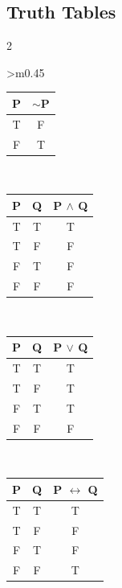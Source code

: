 \newpage

\subsection{Truth Tables}

\begin{multicols}{2}
\centering

\begin{tabular}{>{\centering\arraybackslash}m{0.45\textwidth}}

\begin{minipage}[c][12em][c]{\linewidth}
\centering
{}
\begin{tabular}{|c|c|}
\hline
\textbf{P} & \textbf{$\sim$P} \\ \hline
T & F \\ \hline
F & T \\ \hline
\end{tabular}
\end{minipage}
\\

\begin{minipage}[c][12em][c]{\linewidth}
\centering
{}
\begin{tabular}{|c|c|c|}
\hline
\textbf{P} & \textbf{Q} & \textbf{P $\land$ Q} \\ \hline
T & T & T \\ \hline
T & F & F \\ \hline
F & T & F \\ \hline
F & F & F \\ \hline
\end{tabular}
\end{minipage}
\\

\begin{minipage}[c][12em][c]{\linewidth}
\centering
{}
\begin{tabular}{|c|c|c|}
\hline
\textbf{P} & \textbf{Q} & \textbf{P $\lor$ Q} \\ \hline
T & T & T \\ \hline
T & F & T \\ \hline
F & T & T \\ \hline
F & F & F \\ \hline
\end{tabular}
\end{minipage}
\\

\begin{minipage}[c][12em][c]{\linewidth}
\centering
{}
\begin{tabular}{|c|c|c|}
\hline
\textbf{P} & \textbf{Q} & \textbf{P $\leftrightarrow$ Q} \\ \hline
T & T & T \\ \hline
T & F & F \\ \hline
F & T & F \\ \hline
F & F & T \\ \hline
\end{tabular}
\end{minipage}
\\


\end{tabular}
\end{multicols}
